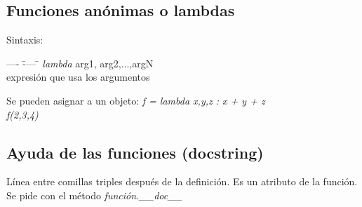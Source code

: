 	\subsection{Funciones anónimas o lambdas}
	\noindent Sintaxis:
	\begin{tabbing}
	---- \= ---- \= \kill
	\> \textit{lambda} arg1, arg2,...,argN  \\ 
	\>\> expresión que usa los argumentos
	\end{tabbing}

	\noindent Se pueden asignar a un objeto: \textit{f = lambda x,y,z : x + y + z}\\
	\textit{f(2,3,4)}	

	\subsection{Ayuda de las funciones (docstring)} \label{docstring}
	\noindent Línea entre comillas triples después de la definición. Es un atributo de la función. Se pide con el método \textit{función.\_\_doc\_\_} 